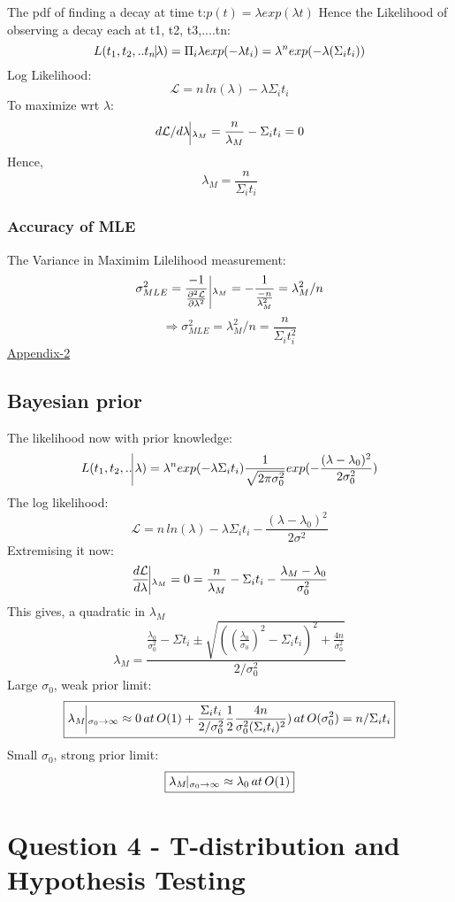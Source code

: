 \documentclass[11pt]{article}
\begin{document}
	The pdf of finding a decay at time t:\(p(t)= \lambda exp(\lambda t)\)
	Hence the Likelihood of observing a decay each at t1, t2, t3,....tn:
	\[
		L(t_1,t_2,..t_n\vline\lambda) = \Pi_i \lambda exp(-\lambda t_i)  =\lambda^n exp(-\lambda(\Sigma_i t_i)) 
	\]
	Log Likelihood:
	\[
		\mathcal{L} = n\, ln(\lambda) - \lambda\Sigma_i t_i
	\]
	To maximize wrt $\lambda$:
	\[
		d\mathcal{L}/d\lambda \vline_{\, \lambda_M}= \frac{n}{\lambda_M} - \Sigma_i t_i = 0
	\]
	Hence,
	\[
		\lambda_M = \frac{n}{\Sigma_i t_i}
	\]
	\subsubsection{Accuracy of MLE}
		
	The Variance in Maximim Lilelihood measurement:
	\[
		\sigma_{MLE}^2 = \frac{-1}{\frac{\partial^2\mathcal{L}}{\partial \lambda^2}} \, \vline_{\,\lambda_M} = -\frac{1}{\frac{-n}{\lambda_M^2}} = \lambda_M^2/n
	\]
	\[
		\Rightarrow \boxed{\sigma_{MLE}^2 = \lambda_M^2/n = \frac{n}{\Sigma_i t_i^2}}
	\]
	\hyperlink{page.10}{\Huge \color{red}Appendix-2}
	
	\subsection{Bayesian prior}
	
	The likelihood now with prior knowledge:
	\[
		L(t_1,t_2,..\vline \, \lambda) = \lambda^n exp(-\lambda \Sigma_i t_i) \frac{1}{\sqrt{2\pi \sigma_0^2}} exp(-\frac{(\lambda -\lambda_0)^2}{2\sigma_0^2})
	\]
	The log likelihood:
	\[
		\mathcal{L} = n\, ln(\lambda) - \lambda \Sigma_i t_i - \frac{(\lambda - \lambda_0)^2}{2\sigma^2}
	\]
	Extremising it now:
	\[
		\frac{d\mathcal{L}}{d\lambda} \vline _{\, \lambda_M} = 0 = \frac{n}{\lambda_M} - \Sigma_i t_i - \frac{\lambda_M-\lambda_0}{\sigma_0^2}
	\]
	This gives, a quadratic in $\lambda_M$
	\[
		\boxed{\lambda_M = \frac{\frac{\lambda_0}{\sigma_0^2}- \Sigma t_i \pm \sqrt{((\frac{\lambda_0}{\sigma_0})^2 - \Sigma_i t_i)^2+ \frac{4n}{\sigma_0^2}}}{2/\sigma_0^2}}
	\]
	Large $\sigma_0$, weak prior limit:
	\[
		\boxed{\lambda_M \vline_{\, \sigma_0 \rightarrow \infty} \approx 0 \, at \, O(1) + \frac{\Sigma_i t_i}{2/\sigma_0^2}\frac{1}{2}\frac{4n}{\sigma_0^2 (\Sigma_i t_i)^2}) \, at \, O(\sigma_0^2) = n/\Sigma_i t_i}
	\]
	Small $\sigma_0$, strong prior limit:
	\[
		\boxed{\lambda_M \vline_{\, \sigma_0 \rightarrow \infty} \approx \lambda_0 \, at \, O(1)}
 	\]
	
	\section{\color{teal} Question 4 - T-distribution and Hypothesis Testing}
	
\end{document}
